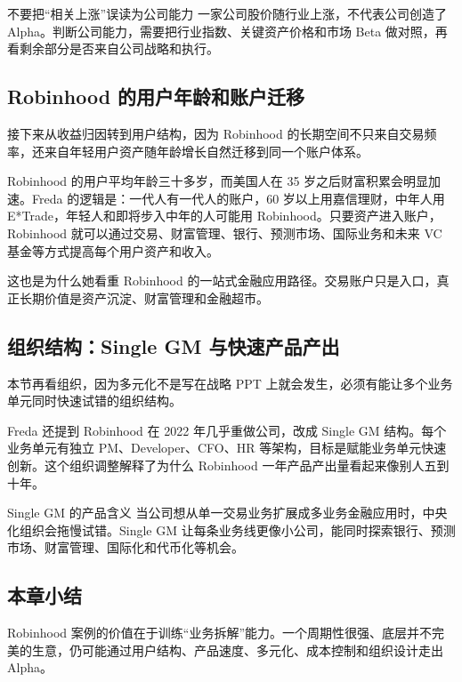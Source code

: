 \documentclass[a4paper]{article}
\begin{document}
\begin{warningbox}{不要把“相关上涨”误读为公司能力}
一家公司股价随行业上涨，不代表公司创造了 Alpha。判断公司能力，需要把行业指数、关键资产价格和市场 Beta 做对照，再看剩余部分是否来自公司战略和执行。
\end{warningbox}

\subsection{Robinhood 的用户年龄和账户迁移}

接下来从收益归因转到用户结构，因为 Robinhood 的长期空间不只来自交易频率，还来自年轻用户资产随年龄增长自然迁移到同一个账户体系。

Robinhood 的用户平均年龄三十多岁，而美国人在 35 岁之后财富积累会明显加速。Freda 的逻辑是：一代人有一代人的账户，60 岁以上用嘉信理财，中年人用 E*Trade，年轻人和即将步入中年的人可能用 Robinhood。只要资产进入账户，Robinhood 就可以通过交易、财富管理、银行、预测市场、国际业务和未来 VC 基金等方式提高每个用户资产和收入。

这也是为什么她看重 Robinhood 的一站式金融应用路径。交易账户只是入口，真正长期价值是资产沉淀、财富管理和金融超市。

\subsection{组织结构：Single GM 与快速产品产出}

本节再看组织，因为多元化不是写在战略 PPT 上就会发生，必须有能让多个业务单元同时快速试错的组织结构。

Freda 还提到 Robinhood 在 2022 年几乎重做公司，改成 Single GM 结构。每个业务单元有独立 PM、Developer、CFO、HR 等架构，目标是赋能业务单元快速创新。这个组织调整解释了为什么 Robinhood 一年产品产出量看起来像别人五到十年。

\begin{importantbox}{Single GM 的产品含义}
当公司想从单一交易业务扩展成多业务金融应用时，中央化组织会拖慢试错。Single GM 让每条业务线更像小公司，能同时探索银行、预测市场、财富管理、国际化和代币化等机会。
\end{importantbox}

\subsection{本章小结}

Robinhood 案例的价值在于训练“业务拆解”能力。一个周期性很强、底层并不完美的生意，仍可能通过用户结构、产品速度、多元化、成本控制和组织设计走出 Alpha。
\end{document}
